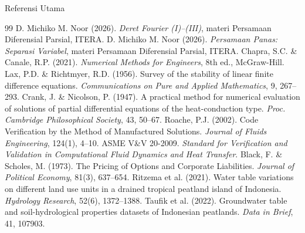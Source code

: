 \documentclass[aspectratio=169,10pt]{beamer}
\begin{document}
\begin{frame}{Referensi Utama}
\scriptsize
\begin{thebibliography}{99}
 D. Michiko M. Noor (2026). \emph{Deret Fourier (I)--(III)}, materi Persamaan Diferensial Parsial, ITERA.
 D. Michiko M. Noor (2026). \emph{Persamaan Panas: Separasi Variabel}, materi Persamaan Diferensial Parsial, ITERA.
 Chapra, S.C. \& Canale, R.P. (2021). \emph{Numerical Methods for Engineers}, 8th ed., McGraw-Hill.
 Lax, P.D. \& Richtmyer, R.D. (1956). Survey of the stability of linear finite difference equations. \emph{Communications on Pure and Applied Mathematics}, 9, 267--293.
 Crank, J. \& Nicolson, P. (1947). A practical method for numerical evaluation of solutions of partial differential equations of the heat-conduction type. \emph{Proc. Cambridge Philosophical Society}, 43, 50--67.
 Roache, P.J. (2002). Code Verification by the Method of Manufactured Solutions. \emph{Journal of Fluids Engineering}, 124(1), 4--10.
 ASME V\&V 20-2009. \emph{Standard for Verification and Validation in Computational Fluid Dynamics and Heat Transfer}.
 Black, F. \& Scholes, M. (1973). The Pricing of Options and Corporate Liabilities. \emph{Journal of Political Economy}, 81(3), 637--654.
 Ritzema et al. (2021). Water table variations on different land use units in a drained tropical peatland island of Indonesia. \emph{Hydrology Research}, 52(6), 1372--1388.
 Taufik et al. (2022). Groundwater table and soil-hydrological properties datasets of Indonesian peatlands. \emph{Data in Brief}, 41, 107903.
\end{thebibliography}
\end{frame}
\end{document}
